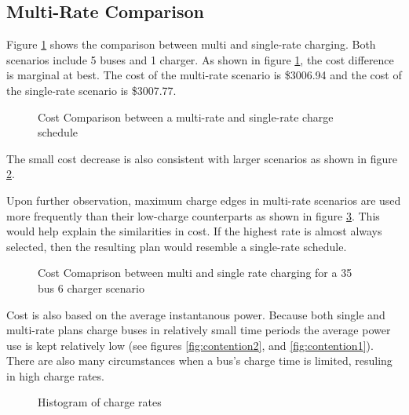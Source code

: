 \subsection{Multi-Rate Comparison}
Figure \ref{fig:multiRateCostComparison} shows the comparison between multi and single-rate charging. Both scenarios include 5 buses and 1 charger. As shown in figure \ref{fig:multiRateCostComparison}, the cost difference is marginal at best.  The cost of the multi-rate scenario is \$3006.94 and the cost of the single-rate scenario is \$3007.77. 
\begin{figure}
	\centering
	\caption{Cost Comparison between a multi-rate and single-rate charge schedule}
	\label{fig:multiRateCostComparison}
\end{figure}
The small cost decrease is also consistent with larger scenarios as shown in figure \ref{fig:costComparisonMultiVsSingleLarge}. 
\par Upon further observation, maximum charge edges in multi-rate scenarios are used more frequently than their low-charge counterparts as shown in figure \ref{fig:chargeRateHistogram}. This would help explain the similarities in cost. If the highest rate is almost always selected, then the resulting plan would resemble a single-rate schedule.  
\begin{figure}
	\caption{Cost Comaprison between multi and single rate charging for a 35 bus 6 charger scenario}
	\label{fig:costComparisonMultiVsSingleLarge}
\end{figure}
\par Cost is also based on the average instantanous power. Because both single and multi-rate plans charge buses in relatively small time periods the average power use is kept relatively low (see figures \ref{fig:contention2}, and \ref{fig:contention1}). There are also many circumstances when a bus's charge time is limited, resuling in high charge rates.
\begin{figure}
	\caption{Histogram of charge rates}
	\label{fig:chargeRateHistogram}
\end{figure}













